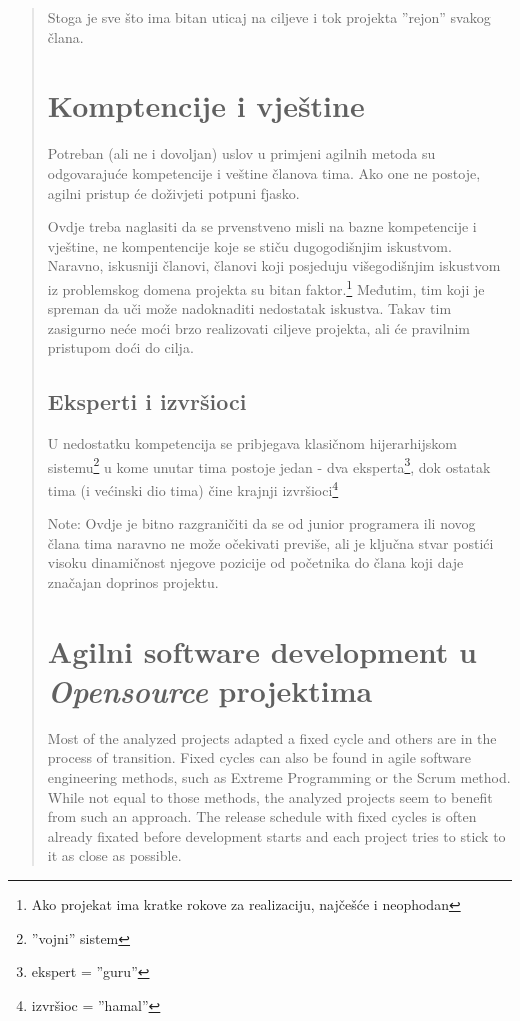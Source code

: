 \documentclass[lmodern, utf8, zavrsni]{fit}
\begin{document}
\begin{quote}
Stoga je sve što ima bitan uticaj na ciljeve i tok projekta ''rejon'' svakog člana.

\section{Komptencije i vještine}

Potreban (ali ne i dovoljan) uslov u primjeni agilnih metoda su odgovarajuće kompetencije i veštine članova tima. Ako one ne postoje, agilni pristup će doživjeti potpuni fjasko.

Ovdje treba naglasiti da se prvenstveno misli na bazne kompetencije i vještine, ne kompentencije koje se stiču dugogodišnjim iskustvom. Naravno, iskusniji članovi, članovi koji posjeduju višegodišnjim iskustvom iz problemskog domena projekta su bitan faktor.\footnote{Ako projekat ima kratke rokove za realizaciju, najčešće i neophodan} Međutim, tim koji je spreman da uči može nadoknaditi nedostatak iskustva. Takav tim zasigurno neće moći brzo realizovati ciljeve projekta, ali će pravilnim pristupom doći do cilja.

\subsection{Eksperti i izvršioci}

U nedostatku kompetencija se pribjegava klasičnom hijerarhijskom sistemu\footnote{''vojni'' sistem} u kome unutar tima postoje jedan - dva eksperta\footnote{ekspert = ''guru''}, dok ostatak tima (i većinski dio tima) čine krajnji izvršioci\footnote{izvršioc = ''hamal''}

Note: Ovdje je bitno razgraničiti da se od junior programera ili novog člana tima naravno ne može očekivati previše, ali je ključna stvar postići visoku dinamičnost njegove pozicije od početnika do člana koji daje značajan doprinos projektu.


\section{Agilni software development u \emph{Opensource} projektima}

Most of the analyzed projects adapted a fixed cycle and others are in the process of transition. Fixed cycles can also be found in agile software engineering methods, such as Extreme Programming or the Scrum method. While not equal to those methods, the analyzed projects seem to benefit from such an approach. The release schedule with fixed cycles is often already fixated before development starts and each project tries to stick to it as close as possible.\citep[str. 95]{Siegel2012}


\end{quote}
\end{document}
